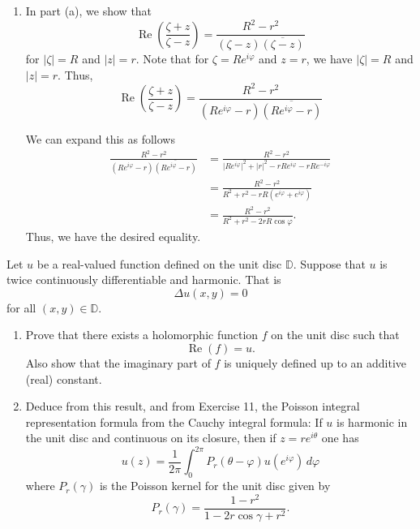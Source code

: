 \documentclass[12 pt, letterpaper]{hmcpset}
\begin{document}
\begin{solution}
\begin{enumerate}
			However, notice that
			\[
				\begin{split}
					g(z) & = f(z) \frac{R^{2} - r^{2}}{R^{2} - \overline{z} z} \\
					     & = f(z) \frac{R^{2} - r^{2}}{R^{2} - r^{2}} \\
					     & = f(z).
				\end{split}
			\]
			Thus, we have the equality
			\[
				f(z) = \frac{1}{2 \pi} \int_{0}^{2 \pi} f(R e^{i \varphi}) \operatorname{Re} \left ( \frac{R e^{i \varphi} + z}{R e^{i \varphi} - z} \right ) \, d \varphi.
			\]
		\item In part (a), we show that
			\[
				\operatorname{Re} \left ( \frac{\zeta + z}{\zeta - z} \right ) = \frac{R^{2} - r^{2}}{(\zeta - z)\overline{(\zeta - z)}}
			\]
			for $\lvert \zeta \rvert = R$ and $\lvert z \rvert = r$. Note that for $\zeta = R e^{i \varphi}$ and $z = r$, we have $\lvert \zeta \rvert = R$ and $\lvert z \rvert = r$. Thus,
			\[
				\operatorname{Re} \left ( \frac{\zeta + z}{\zeta - z} \right ) = \frac{R^{2} - r^{2}}{(R e^{i \varphi} - r)\overline{(R e^{i \varphi} - r)}}
			\]

			We can expand this as follows
			\[
				\begin{split}
					\frac{R^{2} - r^{2}}{(R e^{i \varphi} - r) \overline{(R e^{i \varphi} - r)}} & = \frac{R^{2} - r^{2}}{\lvert R e^{i \varphi} \rvert^{2} + \lvert r \rvert^{2} - r R e^{i \varphi} - r Re^{- i \varphi}} \\
														     & = \frac{R^{2} - r^{2}}{R^{2} + r^{2} - rR(e^{i \varphi} + e^{i \varphi})} \\
														     & = \frac{R^{2} - r^{2}}{R^{2} + r^{2} - 2 r R \cos{\varphi}}.
				\end{split}
			\]
			Thus, we have the desired equality.
	\end{enumerate}
\end{solution}

\pagebreak

\begin{problem}[12.]
	Let $u$ be a real-valued function defined on the unit disc $\mathbb{D}$. Suppose that $u$ is twice continuously differentiable and harmonic. That is
	\[
		\Delta u(x, y) = 0
	\]
	for all $(x, y) \in \mathbb{D}$.
	\begin{enumerate}
		\item Prove that there exists a holomorphic function $f$ on the unit disc such that
			\[
				\operatorname{Re}(f) = u.
			\]
			Also show that the imaginary part of $f$ is uniquely defined up to an additive (real) constant.
		\item Deduce from this result, and from Exercise 11, the Poisson integral representation formula from the Cauchy integral formula: If $u$ is harmonic in the unit disc and continuous on its closure, then if $z = r e^{i \theta}$ one has
			\[
				u(z) = \frac{1}{2 \pi} \int_{0}^{2 \pi} P_{r}(\theta - \varphi) u(e^{i \varphi}) \, d\varphi 
			\]
			where $P_{r}(\gamma)$ is the Poisson kernel for the unit disc given by
			\[
				P_{r}(\gamma) = \frac{1 - r^{2}}{1 - 2r \cos{\gamma} + r^{2}}.
			\]
	\end{enumerate}
\end{problem}
\end{document}
